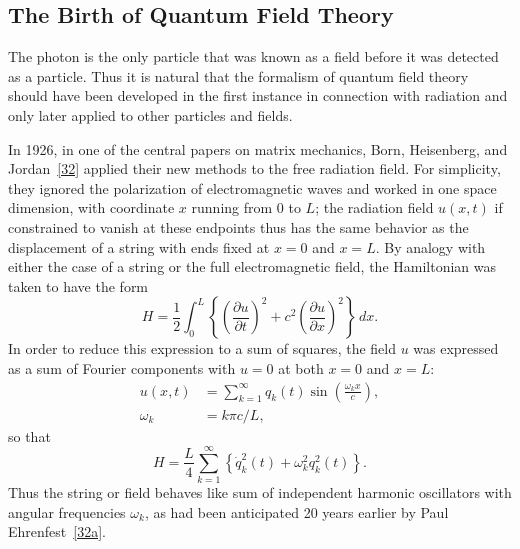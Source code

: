 
\subsection{The Birth of Quantum Field Theory}

The photon is the only particle that was known as a field before it was
detected as a particle. Thus it is natural that the formalism of quantum
field theory should have been developed in the first instance in connection
with radiation and only later applied to other particles and fields.

In 1926, in one of the central papers on matrix mechanics, Born,
Heisenberg, and Jordan~\hyperref[ref:1.32]{[32]} applied their new methods to the free radiation
field. For simplicity, they ignored the polarization of electromagnetic
waves and worked in one space dimension, with coordinate $x$ running
from 0 to $L$; the radiation field $u(x,t)$ if constrained to vanish at these
endpoints thus has the same behavior as the displacement of a string with
ends fixed at $x=0$ and $x=L$. By analogy with either the case of a string
or the full electromagnetic field, the Hamiltonian was taken to have the
form
\begin{equation}
  H=\frac{1}{2}\int_0^L
  \left\{\left(\frac{\partial u}{\partial t}\right)^2
  +c^2\left(\frac{\partial u}{\partial x}\right)^2\right\}\,dx.
  \tag{1.2.1}\label{eq:1.2.1}
\end{equation}
In order to reduce this expression to a sum of squares, the field $u$ was
expressed as a sum of Fourier components with $u=0$ at both $x=0$ and
$x=L$:
\begin{align}
  u(x,t)&=\sum_{k=1}^{\infty}q_k(t)\sin\left(\frac{\omega_kx}{c}\right),
  \tag{1.2.2}\label{eq:1.2.2}\\
  \omega_k&=k\pi c/L,
  \tag{1.2.3}\label{eq:1.2.3}
\end{align}
so that
\begin{equation}
  H=\frac{L}{4}\sum_{k=1}^{\infty}
  \left\{\dot q_k^2(t)+\omega_k^2q_k^2(t)\right\}.
  \tag{1.2.4}\label{eq:1.2.4}
\end{equation}
Thus the string or field behaves like sum of independent harmonic oscillators
with angular frequencies $\omega_k$, as had been anticipated 20 years earlier
by Paul Ehrenfest~\hyperref[ref:1.32a]{[32a]}.

